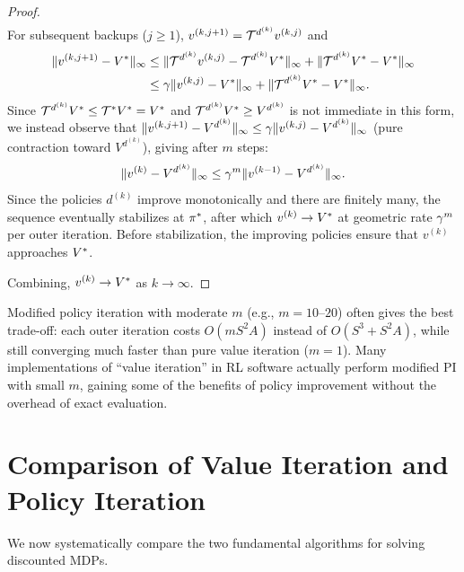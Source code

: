 \documentclass[11pt,a4paper]{article}
\begin{document}
\begin{proof}
\begin{align*}
\end{align*}
For subsequent backups ($j \geq 1$),
$v^{(k,j+1)} = \mathcal{T}^{d^{(k)}} v^{(k,j)}$ and
\begin{align*}
    \|v^{(k,j+1)} - V^*\|_\infty
    &\leq \|\mathcal{T}^{d^{(k)}} v^{(k,j)} - \mathcal{T}^{d^{(k)}}
    V^*\|_\infty + \|\mathcal{T}^{d^{(k)}} V^* - V^*\|_\infty \\
    &\leq \gamma \|v^{(k,j)} - V^*\|_\infty
    + \|\mathcal{T}^{d^{(k)}} V^* - V^*\|_\infty.
\end{align*}
Since $\mathcal{T}^{d^{(k)}} V^* \leq \mathcal{T}^* V^* = V^*$
and $\mathcal{T}^{d^{(k)}} V^* \geq V^{d^{(k)}}$ is not immediate
in this form, we instead observe that
$\|v^{(k,j+1)} - V^{d^{(k)}}\|_\infty \leq \gamma
\|v^{(k,j)} - V^{d^{(k)}}\|_\infty$ (pure contraction toward
$V^{d^{(k)}}$), giving after $m$ steps:
\[
    \|v^{(k)} - V^{d^{(k)}}\|_\infty \leq \gamma^m
    \|v^{(k-1)} - V^{d^{(k)}}\|_\infty.
\]
Since the policies $d^{(k)}$ improve monotonically and there are
finitely many, the sequence eventually stabilizes at $\pi^*$,
after which $v^{(k)} \to V^*$ at geometric rate $\gamma^m$
per outer iteration. Before stabilization, the improving policies
ensure that $v^{(k)}$ approaches $V^*$.

Combining, $v^{(k)} \to V^*$ as $k \to \infty$.
\end{proof}

\begin{rlconnection}[title={Modified PI in Practice}]
Modified policy iteration with moderate $m$ (e.g., $m = 10$--$20$)
often gives the best trade-off: each outer iteration costs
$O(m S^2 A)$ instead of $O(S^3 + S^2 A)$, while still converging
much faster than pure value iteration ($m = 1$). Many
implementations of ``value iteration'' in RL software actually
perform modified PI with small $m$, gaining some of the benefits
of policy improvement without the overhead of exact evaluation.
\end{rlconnection}


\section{Comparison of Value Iteration and Policy Iteration}
\label{sec:comparison}

We now systematically compare the two fundamental algorithms for
solving discounted MDPs.
\end{document}
